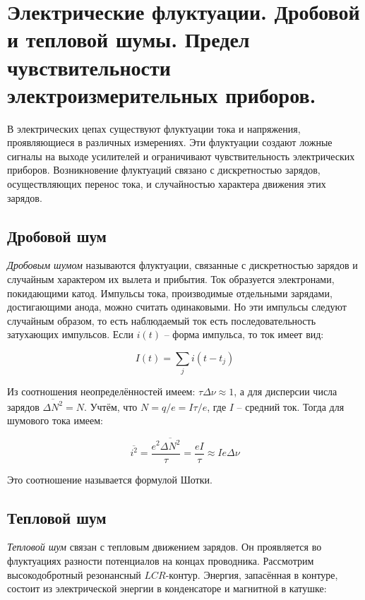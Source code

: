 \section{Электрические флуктуации. Дробовой и тепловой шумы. Предел чувствительности электроизмерительных приборов.}

В электрических цепах существуют флуктуации тока и напряжения, проявляющиеся в различных измерениях. Эти флуктуации создают ложные сигналы на выходе усилителей и ограничивают чувствительность электрических приборов. Возникновение флуктуаций связано с дискретностью зарядов, осуществляющих перенос тока, и случайностью характера движения этих зарядов.

\subsection*{Дробовой шум}

\textit{Дробовым шумом} называются флуктуации, связанные с дискретностью зарядов и случайным характером их вылета и прибытия. Ток образуется электронами, покидающими катод. Импульсы тока, производимые отдельными зарядами, достигающими анода, можно считать одинаковыми. Но эти импульсы следуют случайным образом, то есть наблюдаемый ток есть последовательность затухающих импульсов. Если $i(t)$ -- форма импульса, то ток имеет вид:

\begin{equation}
    I(t) = \sum_j i \left( t - t_j \right)
\end{equation}

Из соотношения неопределённостей имеем: $\tau \Delta \nu \approx 1$, а для дисперсии числа зарядов $\overline{\Delta N^2} = N$. Учтём, что $N = q / e = I \tau /e$, где $I$ -- средний ток. Тогда для шумового тока имеем:

\begin{equation*}
    \overline{i^2} = \frac{e^2 \overline{\Delta N^2}}{\tau} = \frac{e I}{\tau} \approx I e \Delta \nu
\end{equation*}

\noindent
Это соотношение называется формулой Шотки.

\subsection*{Тепловой шум}

\textit{Тепловой шум} связан с тепловым движением зарядов. Он проявляется во флуктуациях разности потенциалов на концах проводника. Рассмотрим высокодобротный резонансный $LCR$-контур. Энергия, запасённая в контуре, состоит из электрической энергии в конденсаторе и магнитной в катушке:

